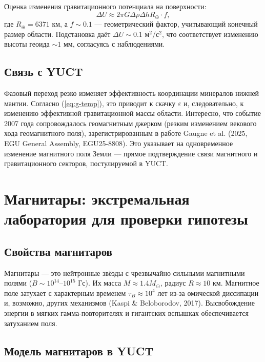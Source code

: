 \documentclass[12pt]{article}
\theoremstyle{remark}
\newcommand{\eps}{\varepsilon}
\begin{document}
	Оценка изменения гравитационного потенциала на поверхности:
	\begin{equation}
		\Delta U \approx 2\pi G \Delta\rho \Delta h R_\oplus \cdot f,
		\label{eq:delta-u}
	\end{equation}
	где $R_\oplus = 6371$ км, а $f \sim 0.1$ — геометрический фактор, учитывающий конечный размер области. Подстановка даёт $\Delta U \sim 0.1$ м$^2$/с$^2$, что соответствует изменению высоты геоида $\sim 1$ мм, согласуясь с наблюдениями.
	
	\subsection{Связь с YUCT}
	\label{subsec:grace-yuct}
	
	Фазовый переход резко изменяет эффективность координации минералов нижней мантии. Согласно (\ref{eq:g-temp}), это приводит к скачку $\eps$ и, следовательно, к изменению эффективной гравитационной массы области. Интересно, что событие 2007 года сопровождалось геомагнитным джерком (резким изменением векового хода геомагнитного поля), зарегистрированным в работе Gaugne et al. (2025, EGU General Assembly, EGU25-8808). Это указывает на одновременное изменение магнитного поля Земли — прямое подтверждение связи магнитного и гравитационного секторов, постулируемой в YUCT.
	
	\section{Магнитары: экстремальная лаборатория для проверки гипотезы}
	\label{sec:magnetars}
	
	\subsection{Свойства магнитаров}
	\label{subsec:magnetars-properties}
	
	Магнитары — это нейтронные звёзды с чрезвычайно сильными магнитными полями ($B \sim 10^{14}$–$10^{15}$ Гс). Их масса $M \approx 1.4 M_\odot$, радиус $R \approx 10$ км. Магнитное поле затухает с характерным временем $\tau_B \approx 10^4$ лет из-за омической диссипации и, возможно, других механизмов (Kaspi \& Beloborodov, 2017). Высвобождение энергии в мягких гамма-повторителях и гигантских вспышках обеспечивается затуханием поля.
	
	\subsection{Модель магнитаров в YUCT}
	\label{subsec:magnetars-model}
	
\end{document}
